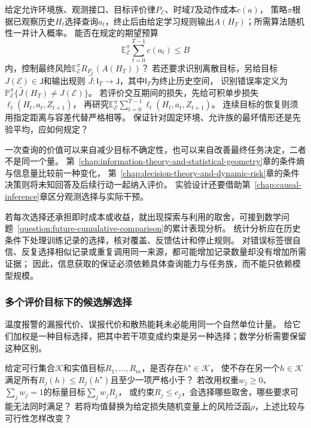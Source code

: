 \begin{mathproblem}[观测选择策略的信息收益与代价]
  \label{question:future-information-acquisition}
  给定允许环境族、观测接口、目标评价律$P_{\mathcal E}$、时域$T$及动作成本$c(a)$，
  策略$\pi$根据已观察历史$H_t$选择查询$a_t$，终止后由给定学习规则输出$A(H_T)$；所需算法随机性一并计入概率。
  能否在规定的期望预算
  \[
    \mathbb E_{\mathcal E}^{\pi}\sum_{t=0}^{T-1}c(a_t)\leq B
  \]
  内，控制最终风险$\mathbb E_{\mathcal E}^{\pi}R_{P_{\mathcal E}}(A(H_T))$？
  若还要求识别离散目标，另给目标$J(\mathcal E)\in\mathsf J$和输出规则
  $\widehat J:\mathsf I_T\to\mathsf J$，其中$\mathsf I_T$为终止历史空间，
  识别错误率定义为$\mathbb P_{\mathcal E}^{\pi}\{\widehat J(H_T)\ne J(\mathcal E)\}$。
  若评价交互期间的损失，先给可积单步损失$\ell_t(H_t,a_t,Z_{t+1})$，
  再研究$\mathbb E_{\mathcal E}^{\pi}\sum_{t=0}^{T-1}\ell_t(H_t,a_t,Z_{t+1})$。
  连续目标的恢复则须用指定距离与容差代替严格相等。
  保证针对固定环境、允许族的最坏情形还是先验平均，应如何规定？
\end{mathproblem}

一次查询的价值可以来自减少目标不确定性，也可以来自改善最终任务决定，二者不是同一个量。
第~\ref{chap:information-theory-and-statistical-geometry}章的条件熵与信息量比较前一种变化，
第~\ref{chap:decision-theory-and-dynamic-risk}章的条件决策则将未知回答及后续行动一起纳入评价。
实验设计还要借助第~\ref{chap:causal-inference}章区分观测选择与实际干预。

若每次选择还承担即时成本或收益，就出现探索与利用的取舍，可接到数学问题~\ref{question:future-cumulative-comparison}的累计表现分析。
统计分析应在历史条件下处理训练记录的选择，核对覆盖、反馈估计和停止规则。
对错误标签很自信、反复选择相似记录或重复调用同一来源，都可能增加记录数量却没有增加所需证据；
因此，信息获取的保证必须依赖具体查询能力与任务族，而不能只依赖模型规模。

\subsubsection{多个评价目标下的候选解选择}
\label{sec:future-analysis-multiple-objectives}

温度报警的漏报代价、误报代价和散热能耗未必能用同一个自然单位计量。
给它们加权是一种目标选择，把其中若干项变成约束是另一种选择；数学分析需要保留这种区别。

\begin{mathproblem}
  \label{question:future-multiple-objectives}
  给定可行集合$\mathcal K$和实值目标$R_1,\ldots,R_m$，是否存在$h^\star\in\mathcal K$，
  使不存在另一个$h\in\mathcal K$满足所有$R_j(h)\leq R_j(h^\star)$且至少一项严格小于？
  若改用权重$w_j\geq0$、$\sum_jw_j=1$的标量目标$\sum_jw_jR_j$，
  或约束$R_j\leq c_j$，会选择哪些取舍，哪些要求可能无法同时满足？
  若将均值替换为给定损失随机变量上的风险泛函$\rho$，上述比较与可行性怎样改变？
\end{mathproblem}

